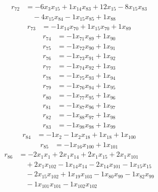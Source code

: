 \[\begin{aligned}
r_{72} &= - 6 x_{3} x_{15} + 1 x_{14} x_{83} + 12 x_{15} - 8 x_{15} x_{83} \\
 &\quad - 4 x_{15} x_{84} - 1 x_{15} x_{85} + 1 x_{88}
\end{aligned}\]
\[\begin{aligned}
r_{73} &= - 1 x_{14} x_{70} + 1 x_{15} x_{70} + 1 x_{89}
\end{aligned}\]
\[\begin{aligned}
r_{74} &= - 1 x_{71} x_{89} + 1 x_{90}
\end{aligned}\]
\[\begin{aligned}
r_{75} &= - 1 x_{72} x_{90} + 1 x_{91}
\end{aligned}\]
\[\begin{aligned}
r_{76} &= - 1 x_{73} x_{91} + 1 x_{92}
\end{aligned}\]
\[\begin{aligned}
r_{77} &= - 1 x_{74} x_{92} + 1 x_{93}
\end{aligned}\]
\[\begin{aligned}
r_{78} &= - 1 x_{75} x_{93} + 1 x_{94}
\end{aligned}\]
\[\begin{aligned}
r_{79} &= - 1 x_{76} x_{94} + 1 x_{95}
\end{aligned}\]
\[\begin{aligned}
r_{80} &= - 1 x_{77} x_{95} + 1 x_{96}
\end{aligned}\]
\[\begin{aligned}
r_{81} &= - 1 x_{87} x_{96} + 1 x_{97}
\end{aligned}\]
\[\begin{aligned}
r_{82} &= - 1 x_{88} x_{97} + 1 x_{98}
\end{aligned}\]
\[\begin{aligned}
r_{83} &= - 1 x_{98} x_{98} + 1 x_{99}
\end{aligned}\]
\[\begin{aligned}
r_{84} &= - 1 x_{2} - 1 x_{2} x_{18} + 1 x_{18} + 1 x_{100}
\end{aligned}\]
\[\begin{aligned}
r_{85} &= - 1 x_{16} x_{100} + 1 x_{101}
\end{aligned}\]
\[\begin{aligned}
r_{86} &= - 2 x_{1} x_{1} + 2 x_{1} x_{14} + 2 x_{1} x_{15} + 2 x_{1} x_{101} \\
 &\quad + 2 x_{1} x_{102} - 1 x_{14} x_{14} - 2 x_{14} x_{101} - 1 x_{15} x_{15} \\
 &\quad - 2 x_{15} x_{102} + 1 x_{19} x_{103} - 1 x_{80} x_{99} - 1 x_{82} x_{99} \\
 &\quad - 1 x_{101} x_{101} - 1 x_{102} x_{102}
\end{aligned}\]
